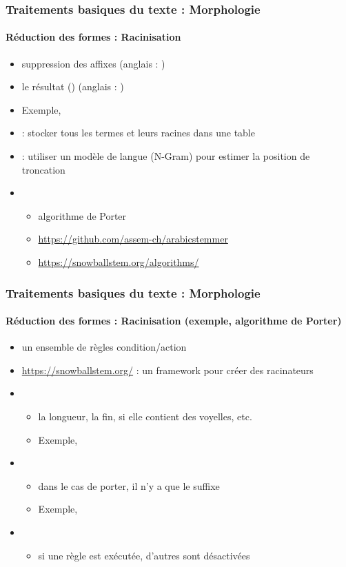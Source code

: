 \documentclass[xcolor=table]{beamer}
\begin{document}
\begin{frame}
\frametitle{Traitements basiques du texte : Morphologie}
\framesubtitle{Réduction des formes : Racinisation}

\begin{itemize}
	\item suppression des affixes (anglais : )
	\item le résultat  () (anglais : )
	\item Exemple, 
	\item {} : stocker tous les termes et leurs racines dans une table
	\item {} : utiliser un modèle de langue (N-Gram) pour estimer la position de troncation
	\item {}
	\begin{itemize}
		\item algorithme de Porter \cite{1980-porter}
		\item \url{https://github.com/assem-ch/arabicstemmer}
		\item \url{https://snowballstem.org/algorithms/}
	\end{itemize}
\end{itemize}

\end{frame}

\begin{frame}
\frametitle{Traitements basiques du texte : Morphologie}
\framesubtitle{Réduction des formes : Racinisation (exemple, algorithme de Porter)}

\begin{itemize}
	\item un ensemble de règles condition/action
	\item \url{https://snowballstem.org/} : un framework pour créer des racinateurs
	\item {}
	\begin{itemize}
		\item la longueur, la fin, si elle contient des voyelles, etc.
		\item Exemple, 
	\end{itemize}
	\item {}
	\begin{itemize}
		\item dans le cas de porter, il n'y a que le suffixe 
		\item Exemple, 
	\end{itemize}
	\item {}
	\begin{itemize}
		\item si une règle est exécutée, d'autres sont désactivées
	\end{itemize}
\end{itemize}

\end{frame}
\end{document}

